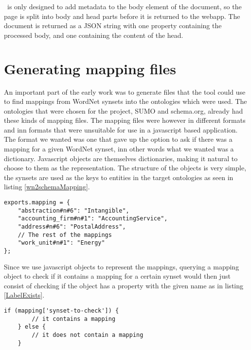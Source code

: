 \Theartefact\ is only designed to add metadata to the body element of the document,
so the page is split into body and head parts before it is returned to the webapp.
The document is returned as a JSON string with one property containing the processed body,
and one containing the content of the head.


\section{Generating mapping files}
An important part of the early work was to generate files that the tool could use to find mappings from WordNet synsets
into the ontologies which were used.
The ontologies that were chosen for the project, SUMO  and schema.org, already had these kinds of mapping files.
The mapping files were however in different formats and inn formats that were unsuitable for use in a javascript based application.
The format we wanted was one that gave up the option to ask if there was a mapping for a given WordNet synset,
inn other words what we wanted was a dictionary.
Javascript objects are themselves dictionaries, making it natural to choose to them as the representation.
The structure of the objects is very simple,
the synsets are used as the keys to entities in the target ontologies as seen in listing \ref{wn2schemaMapping}.

\begin{lstlisting}[label=wn2schemaMapping, caption={Excerpt from the \href{https://github.com/EivindEE/Madame/blob/master/mappings/wn2schema.js}{wn2schema.js} mapping file}]
exports.mapping = {
	"abstraction#n#6": "Intangible",
	"accounting_firm#n#1": "AccountingService",
	"address#n#6": "PostalAddress",
	// The rest of the mappings
	"work_unit#n#1": "Energy"
};
\end{lstlisting}

Since we use javascript objects to represent the mappings,
querying a mapping object to check if it contains a mapping for a certain synset would then just consist of checking if
the object has a property with the given name as in listing \ref{LabelExists}.
\begin{lstlisting}[label=LabelExists,caption=Testing if a mapping exists]
	if (mapping['synset-to-check']) {
		// it contains a mapping
	} else {
		// it does not contain a mapping
	}
\end{lstlisting}


